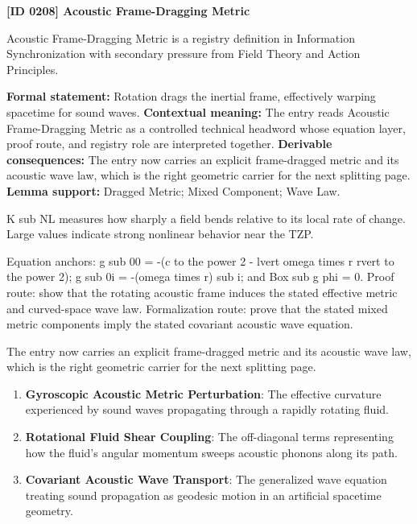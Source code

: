 \clearpage
\noindent\textbf{[ID 0208] Acoustic Frame-Dragging Metric}\par
\vspace{0.35em}
\begingroup\small
{}
Acoustic Frame-Dragging Metric is a registry definition in Information Synchronization with secondary pressure from Field Theory and Action Principles.

\begingroup\footnotesize\setlength{\emergencystretch}{3em}\sloppy
\textbf{Formal statement:} Rotation drags the inertial frame, effectively warping spacetime for sound waves. \textbf{Contextual meaning:} The entry reads Acoustic Frame-Dragging Metric as a controlled technical headword whose equation layer, proof route, and registry role are interpreted together. \textbf{Derivable consequences:} The entry now carries an explicit frame-dragged metric and its acoustic wave law, which is the right geometric carrier for the next splitting page. \textbf{Lemma support:} Dragged Metric; Mixed Component; Wave Law.\par
\endgroup

K sub NL measures how sharply a field bends relative to its local rate of change. Large values indicate strong nonlinear behavior near the TZP.

Equation anchors: g sub 00 = -(c to the power 2 - lvert omega times r rvert to the power 2); g sub 0i = -(omega times r) sub i; and Box sub g phi = 0. Proof route: show that the rotating acoustic frame induces the stated effective metric and curved-space wave law. Formalization route: prove that the stated mixed metric components imply the stated covariant acoustic wave equation.

The entry now carries an explicit frame-dragged metric and its acoustic wave law, which is the right geometric carrier for the next splitting page.
\endgroup

\begin{enumerate}[leftmargin=1.6em,itemsep=6pt,topsep=4pt]
\item \textbf{Gyroscopic Acoustic Metric Perturbation}: The effective curvature experienced by sound waves propagating through a rapidly rotating fluid.
\item \textbf{Rotational Fluid Shear Coupling}: The off-diagonal terms representing how the fluid's angular momentum sweeps acoustic phonons along its path.
\item \textbf{Covariant Acoustic Wave Transport}: The generalized wave equation treating sound propagation as geodesic motion in an artificial spacetime geometry.
\end{enumerate}


